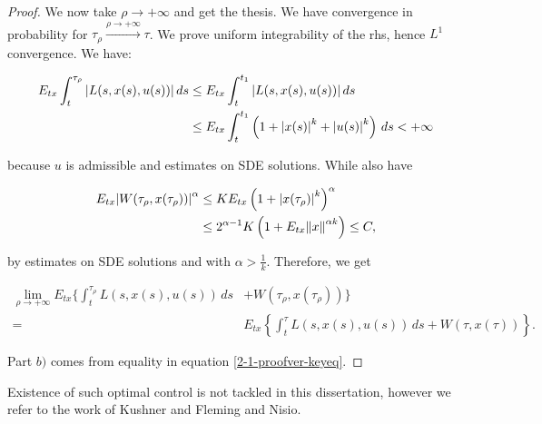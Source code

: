 \begin{theorem}
\begin{proof}
        We now take $\rho\to+\infty$ and get the thesis. We have convergence in probability for $\tau_{\rho}\xrightarrow{\rho\to+\infty}\tau$. 
        We prove uniform integrability of the rhs, hence $L^1$ convergence. We have:
        
        \begin{align*}
            E_{tx}\int_t^{\tau_{\rho}} \abs{L(s,x(s),u(s))}\,ds & \leq E_{tx}\int_t^{t_1}\abs{L(s,x(s),u(s))}\,ds \\
            & \leq E_{tx}\int_t^{t_1}\left(1+\abs{x(s)}^k+\abs{u(s)}^k\right)\,ds < +\infty    
        \end{align*}
        
        because $u$ is admissible and estimates on SDE solutions. While also have

        \begin{align*}
            E_{tx}\abs{W(\tau_{\rho},x(\tau_{\rho}))}^{\alpha} & \leq K E_{tx}\left(1+\abs{x(\tau_{\rho})}^k\right)^{\alpha} \\
            & \leq 2^{\alpha-1}K\left(1+E_{tx}\norm{x}^{\alpha k}\right) \leq C,
        \end{align*}

        by estimates on SDE solutions and with $\alpha>\frac{1}{k}$. Therefore, we get

        \begin{align*}
            \lim_{\rho\to+\infty} E_{tx}\Bigg\{\int_t^{\tau_{\rho}} L(s,x(s),u(s))\,ds & + W(\tau_{\rho},x(\tau_{\rho}))\Bigg\} \\
            = & E_{tx}\left\{\int_t^{\tau} L(s,x(s),u(s))\,ds + W(\tau,x(\tau))\right\}.
        \end{align*}

        Part $b)$ comes from equality in equation \eqref{2-1-proofver-keyeq}.
    \end{proof}
\end{theorem}

\begin{remark}
    Existence of such optimal control is not tackled in this dissertation, however we refer to the work of Kushner\cite{doi:10.1137/0303031} and Fleming and Nisio\cite{e4883aa0-5814-3532-9993-ed3e5d85ff9e}.
\end{remark}




